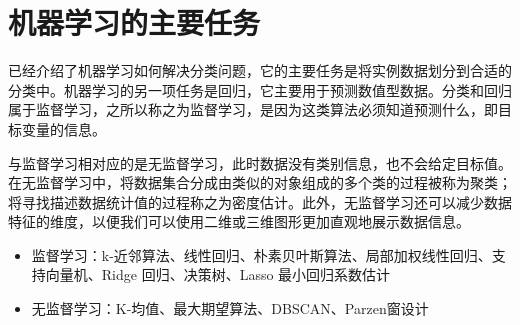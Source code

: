 \section{机器学习的主要任务}
已经介绍了机器学习如何解决分类问题，它的主要任务是将实例数据划分到合适的分类中。机器学习的另一项任务是回归，它主要用于预测数值型数据。分类和回归属于监督学习，之所以称之为监督学习，是因为这类算法必须知道预测什么，即目标变量的信息。

与监督学习相对应的是无监督学习，此时数据没有类别信息，也不会给定目标值。在无监督学习中，将数据集合分成由类似的对象组成的多个类的过程被称为聚类；将寻找描述数据统计值的过程称之为密度估计。此外，无监督学习还可以减少数据特征的维度，以便我们可以使用二维或三维图形更加直观地展示数据信息。

\begin{itemize}
    \item 监督学习：k-近邻算法、线性回归、朴素贝叶斯算法、局部加权线性回归、支持向量机、Ridge 回归、决策树、Lasso 最小回归系数估计
    \item 无监督学习：K-均值、最大期望算法、DBSCAN、Parzen窗设计
\end{itemize}
